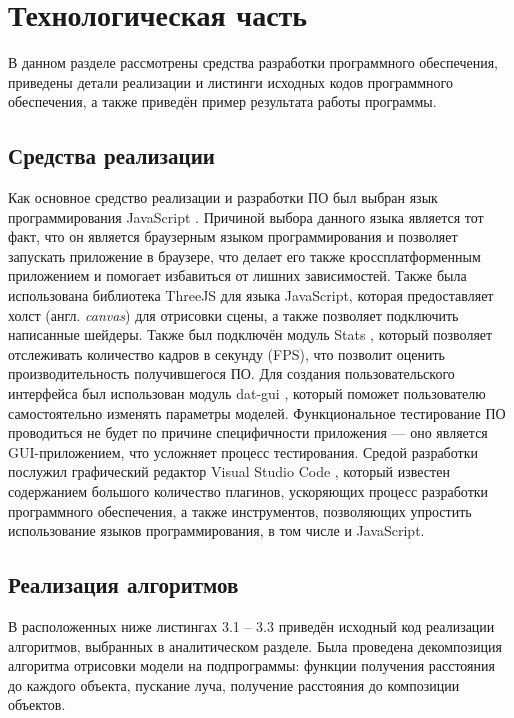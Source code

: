 \section{Технологическая часть}

В  данном  разделе  рассмотрены  средства  разработки  программного 
обеспечения, приведены детали реализации и листинги исходных кодов 
программного обеспечения, а также приведён пример результата работы программы.

\subsection{Средства реализации}
Как  основное  средство  реализации  и  разработки  ПО  был  выбран  язык 
программирования  JavaScript \cite{js}.
Причиной  выбора  данного  языка  является  тот факт,  что  он  является  браузерным  языком  программирования  и  позволяет запускать приложение в браузере, что делает его также кроссплатформенным приложением  и  помогает  избавиться  от  лишних  зависимостей. 
Также  была использована библиотека ThreeJS \cite{threejs} для языка JavaScript, которая предоставляет холст  (англ.  \textit{canvas})  для  отрисовки  сцены,  а  также  позволяет  подключить написанные шейдеры.
Также был подключён модуль Stats \cite{stats}, который позволяет 
отслеживать  количество  кадров  в  секунду  (FPS),  что  позволит  оценить 
производительность  получившегося  ПО.
Для  создания  пользовательского интерфейса  был  использован  модуль  dat-gui \cite{datgui},  который  поможет  пользователю 
самостоятельно  изменять  параметры  моделей.
Функциональное  тестирование ПО  проводиться  не  будет  по  причине  специфичности  приложения  --- оно является  GUI-приложением,  что  усложняет  процесс  тестирования.
Средой разработки  послужил  графический  редактор  Visual  Studio  Code \cite{vscode},  который 
известен  содержанием  большого  количество  плагинов,  ускоряющих  процесс 
разработки  программного  обеспечения,  а  также  инструментов,  позволяющих 
упростить использование языков программирования, в том числе и JavaScript.


\subsection{Реализация алгоритмов}

В  расположенных  ниже  листингах  3.1  --  3.3  приведён  исходный  код 
реализации алгоритмов, выбранных в аналитическом разделе.
Была проведена декомпозиция  алгоритма  отрисовки  модели  на  подпрограммы:  функции 
получения расстояния до каждого объекта, пускание луча, получение расстояния 
до композиции объектов.

